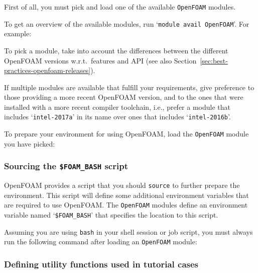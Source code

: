 First of all, you must pick and load one of the available \texttt{OpenFOAM} modules.

To get an overview of the available modules, run `{\small\texttt{module avail OpenFOAM}}'. For example:

\begin{prompt}
\end{prompt}

To pick a module, take into account the differences between the different OpenFOAM versions w.r.t.\ features and
API (see also Section~\ref{sec:best-practices-openfoam-releases}).

If multiple modules are available that fulfill your requirements, give preference to those providing a more recent
OpenFOAM version, and to the ones that were installed with a more recent compiler toolchain, i.e., prefer
a module that includes `{\small\texttt{intel-2017a}}' in its name over ones that includes
`{\small\texttt{intel-2016b}}'.

To prepare your environment for using OpenFOAM, load the \texttt{OpenFOAM} module you have picked:

\begin{prompt}
\end{prompt}

\subsubsection{Sourcing the \texttt{\$FOAM\_BASH} script}

OpenFOAM provides a script that you should \texttt{\small{source}} to further prepare the environment.
This script will define some additional environment variables that are required to use OpenFOAM. The \texttt{OpenFOAM}
modules define an environment variable named `\texttt{\small\$FOAM\_BASH}' that specifies the location to this script.

Assuming you are using \texttt{\small{bash}} in your shell session or job script,
you must always run the following command after loading an \texttt{OpenFOAM} module:

\begin{prompt}
\end{prompt}


\subsubsection{Defining utility functions used in tutorial cases}

